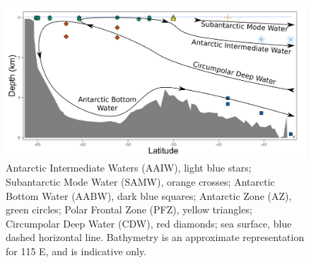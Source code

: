 \begin{figure}
  \centering
  \includegraphics[width=\textwidth]{../advection/advectionsamplemap.png}
  \caption[Map showing sites of samples used in the advection study]{Antarctic Intermediate Waters (AAIW), light blue stars; Subantarctic Mode Water (SAMW), orange crosses; Antarctic Bottom Water (AABW), dark blue squares; Antarctic Zone (AZ), green circles; Polar Frontal Zone (PFZ), yellow triangles; Circumpolar Deep Water (CDW), red diamonds; sea surface, blue dashed horizontal line. Bathymetry is an approximate representation for 115\textdegree{} E, and is indicative only.}
  \label{fig:advectionsamplemap}
\end{figure}
